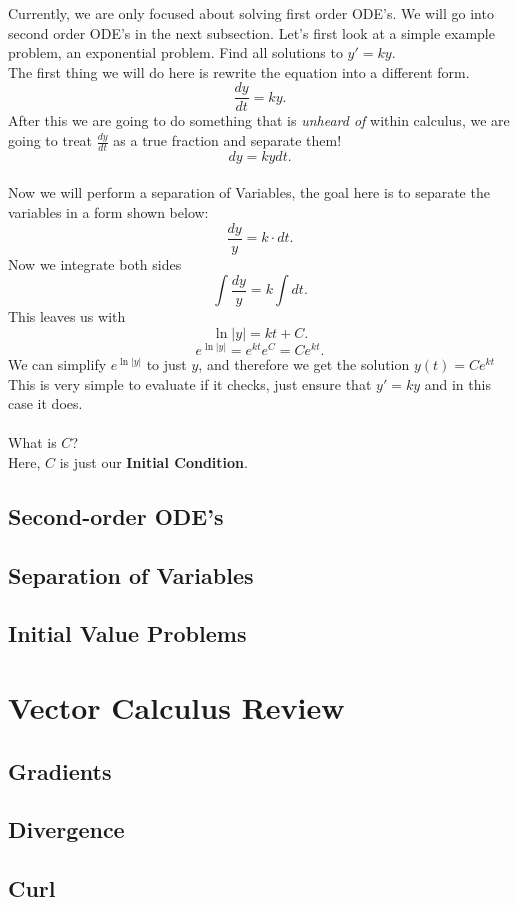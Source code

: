 \documentclass[10pt, oneside]{report}
\begin{document}
Currently, we are only focused about solving first order ODE's. We will go into second order ODE's in the next subsection.
Let's first look at a simple example problem, an exponential problem.  Find all solutions to $y' = ky$.  \\
The first thing we will do here is rewrite the equation into a different form.
\[
\frac{dy}{dt} = ky
.\] After this we are going to do something that is \textit{unheard of} within calculus, we are going to treat $\frac{dy}{dt}$ as a true fraction and separate them!\\
\[
dy=k y dt
.\] \\
Now we will perform a separation of Variables, the goal here is to separate the variables in a form shown below:
\[
\frac{dy}{y} = k \cdot dt
.\] 
Now we integrate both sides
\[
\int\frac{dy}{y} = k \int dt
.\] 
This leaves us with 
\[
\ln |y| = kt+C
.\] 
\[
    e^{\ln |y|} = e^{kt}e^{C} = Ce^{kt}
.\] 
We can simplify $e^{\ln |y|}$ to just  $y$, and therefore we get the solution $y(t) = Ce^{kt}$
\\
This is very simple to evaluate if it checks, just ensure that $y' = ky$ and in this case it does. \\
\\
What is $C$? \\
Here, $C$ is just our \textbf{Initial Condition}.

\subsection{Second-order ODE's}
\subsection{Separation of Variables}
\subsection{Initial Value Problems}

\section{Vector Calculus Review}
\subsection{Gradients}
\subsection{Divergence}
\subsection{Curl}
\end{document}
